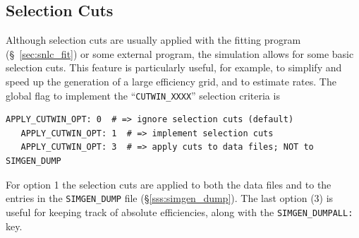 \documentclass[12pt]{article}
\begin{document}
{%

   \clearpage
   \subsection{Selection Cuts }
   \label{subsec:simcuts}

Although selection cuts are usually applied with the
fitting program (\S~\ref{sec:snlc_fit}) 
or some external program, the simulation
allows for some basic selection cuts. This feature
is particularly useful, for example, to simplify and 
speed up the generation of a large efficiency grid,
and to estimate rates.
The global flag to implement the ``{\tt CUTWIN\_XXXX}'' 
selection criteria is
%
\begin{Verbatim}[frame=single]
   APPLY_CUTWIN_OPT: 0  # => ignore selection cuts (default)
   APPLY_CUTWIN_OPT: 1  # => implement selection cuts 
   APPLY_CUTWIN_OPT: 3  # => apply cuts to data files; NOT to SIMGEN_DUMP
\end{Verbatim}
%
For option 1 the selection cuts are applied to both the data files
and to the entries in the {\tt SIMGEN\_DUMP} file
(\S\ref{sss:simgen_dump}).
The last option (3) is useful for keeping track of absolute
efficiencies, along with the {\tt SIMGEN\_DUMPALL:} key.
%

}
\end{document}
